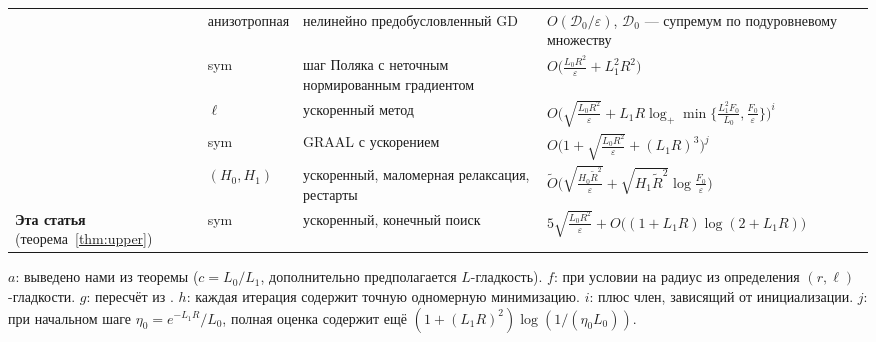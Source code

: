 \begin{center}
\begin{tabularx}{\linewidth}{@{}P{.2\linewidth}lP{.2\linewidth}Y@{}}
\citet{oikonomidis2025nonlinearly} & анизотропная & нелинейно предобусловленный GD & $O(\mathcal D_0/\varepsilon)$, $\mathcal D_0$ --- супремум по подуровневому множеству\\
\citet{kovalev2026normalized} & sym & шаг Поляка с неточным нормированным градиентом & $O\bigl(\frac{L_0R^2}{\varepsilon}+L_1^2R^2\bigr)$\\
\citet{tyurin2026accelerated} & $\ell$ & ускоренный метод & $O\bigl(\sqrt{\frac{L_0R^2}{\varepsilon}}+L_1R\log_+\min\bigl\{\frac{L_1^2F_0}{L_0},\frac{F_0}{\varepsilon}\bigr\}\bigr)^{i}$\\
\citet{borodich2026graal} & sym & GRAAL с ускорением & $O\bigl(1+\sqrt{\frac{L_0R^2}{\varepsilon}}+(L_1R)^3\bigr)^{j}$\\
\citet{lobanov2026accelerated} & $(H_0,H_1)$ & ускоренный, маломерная релаксация, рестарты & $\widetilde O\bigl(\sqrt{\frac{H_0\tilde R^2}{\varepsilon}}+\sqrt{H_1\tilde R^2}\log\frac{F_0}{\varepsilon}\bigr)$\\
\midrule
\textbf{Эта статья} (теорема~\ref{thm:upper}) & sym & ускоренный, конечный поиск & $5\sqrt{\frac{L_0R^2}{\varepsilon}}+O\bigl((1+L_1R)\log(2+L_1R)\bigr)$\\
\bottomrule
\end{tabularx}
\par\smallskip\raggedright
$a$: выведено нами из теоремы ($c=L_0/L_1$, дополнительно предполагается $L$-гладкость). $f$: при условии на радиус из определения $(r,\ell)$-гладкости. $g$: пересчёт из \citet{vankov2025optimizing}. $h$: каждая итерация содержит точную одномерную минимизацию. $i$: плюс член, зависящий от инициализации. $j$: при начальном шаге $\eta_0=e^{-L_1R}/L_0$, полная оценка содержит ещё $(1+(L_1R)^2)\log(1/(\eta_0L_0))$.
\end{center}
